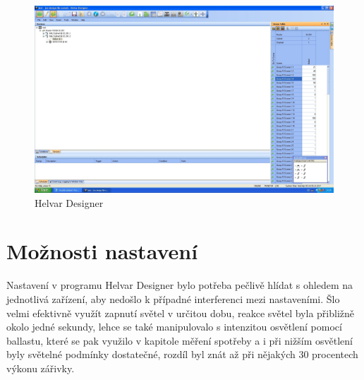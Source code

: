 \documentclass[FM,RP]{tulthesis}
\begin{document}
\vspace{5
	em}
        \begin{figure}[h]
    	\begin{center}
    				
    		\includegraphics[scale=0.25]{helvar.jpg}
    		\caption{Helvar Designer}
    		\label{helvardesign}
    	\end{center}
        \end{figure}
    \vspace{5em}
    \section{Možnosti nastavení}
    Nastavení v programu Helvar Designer bylo potřeba pečlivě hlídat s ohledem na jednotlivá zařízení, aby nedošlo k případné interferenci mezi nastaveními. Šlo velmi efektivně využít zapnutí světel v určitou dobu, reakce světel byla přibližně okolo jedné sekundy, lehce se také manipulovalo s intenzitou osvětlení pomocí ballastu, které se pak využilo v kapitole měření spotřeby a i při nižším osvětlení byly světelné podmínky dostatečné, rozdíl byl znát až při nějakých 30 procentech výkonu zářivky. 
    
\end{document}
